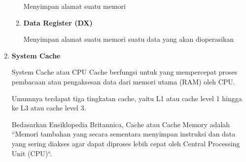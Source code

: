 \begin{enumerate}[label=\alph*.]
\begin{enumerate}[label=\roman*.]
        Menyimpan alamat suatu memori

      \item \textbf{Data Register (DX)}

        Menyimpan alamat suatu memori suatu data yang akan dioperasikan

    \end{enumerate}

  \item \textbf{System Cache}

    System Cache atau CPU Cache berfungsi untuk yang mempercepat proses
    pembacaan atau pengaksesan data dari memori utama (RAM) oleh CPU.

    Umumnya terdapat tiga tingkatan cache,
    yaitu L1 atau cache level 1 hingga ke L3 atau cache level 3.

    Bedasarkan Ensiklopedia Britannica, Cache atau Cache Memory adalah
    ``Memori tambahan yang secara sementara menyimpan instruksi dan data yang
    sering diakses agar dapat diproses lebih cepat oleh Central Processing Unit
    (CPU)``.

\end{enumerate}
